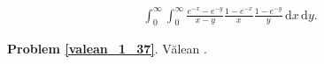 %

\begin{problem_with_solution}
    \label{valean_1_37}%
    \begin{align}
        \int_0^\infty \int_0^\infty \frac {e^{-x}-e^{-y}}{x-y} \frac{1-e^{-x}}{x} \frac{1-e^{-y}}{y} \,\mathrm{d}x \,\mathrm{d}y.
    \end{align} 
\end{problem_with_solution}


\textbf{Problem \ref{valean_1_37}}.
Vălean \cite[s. 25]{nahin15}.


%